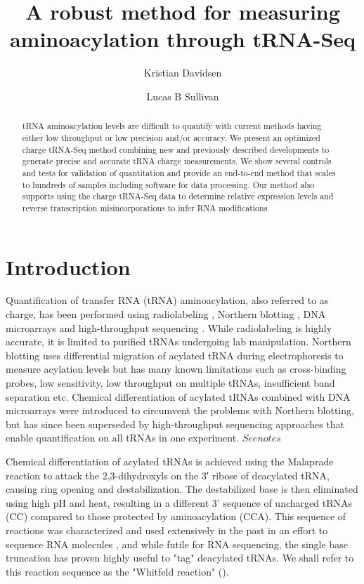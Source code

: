 \documentclass[9pt,lineno]{elife}
\title{A robust method for measuring aminoacylation through tRNA-Seq}
\author[1,2]{Kristian Davidsen}
\author[1*]{Lucas B Sullivan}
\affil[1]{Fred Hutchinson Cancer Center}
\affil[2]{Molecular and cellular biology program, University of Washington}
\begin{document}
\maketitle

\begin{abstract}
tRNA aminoacylation levels are difficult to quantify with current methods having either low throughput or low precision and/or accuracy.
We present an optimized charge tRNA-Seq method combining new and previously described developments to generate precise and accurate tRNA charge measurements.
We show several controls and tests for validation of quantitation and provide an end-to-end method that scales to hundreds of samples including software for data processing.
Our method also supports using the charge tRNA-Seq data to determine relative expression levels and reverse transcription misincorporations to infer RNA modifications.
\end{abstract}



\section{Introduction}
Quantification of transfer RNA (tRNA) aminoacylation, also referred to as charge, has been performed using radiolabeling \citep{Wolfson2002-gp}, Northern blotting \citep{Ho1987-ug, Varshney1991-zp, Stenum2017-wn}, DNA microarrays \citep{Dittmar2005-va} and high-throughput sequencing \citep{Evans2017-st}.
While radiolabeling is highly accurate, it is limited to purified tRNAs undergoing lab manipulation.
Northern blotting uses differential migration of acylated tRNA during electrophoresis to measure acylation levels but has many known limitations such as cross-binding probes, low sensitivity, low throughput on multiple tRNAs, insufficient band separation etc.
Chemical differentiation of acylated tRNAs combined with DNA microarrays were introduced to circumvent the problems with Northern blotting, but has since been superseded by high-throughput sequencing approaches that enable quantification on all tRNAs in one experiment.
$See notes$

Chemical differentiation of acylated tRNAs is achieved using the Malaprade reaction to attack the 2,3-dihydroxyls on the 3′ ribose of deacylated tRNA, causing ring opening and destabilization.
The destabilized base is then eliminated using high pH and heat, resulting in a different 3' sequence of uncharged tRNAs (CC) compared to those protected by aminoacylation (CCA).
This sequence of reactions was characterized and used extensively in the past in an effort to sequence RNA molecules \citep{Whitfeld1953-ca, Whitfeld1954-wl, Khym1961-xf, Neu1964-hu}, and while futile for RNA sequencing, the single base truncation has proven highly useful  to "tag" deacylated tRNAs.
We shall refer to this reaction sequence as the "Whitfeld reaction" ().
\end{document}

